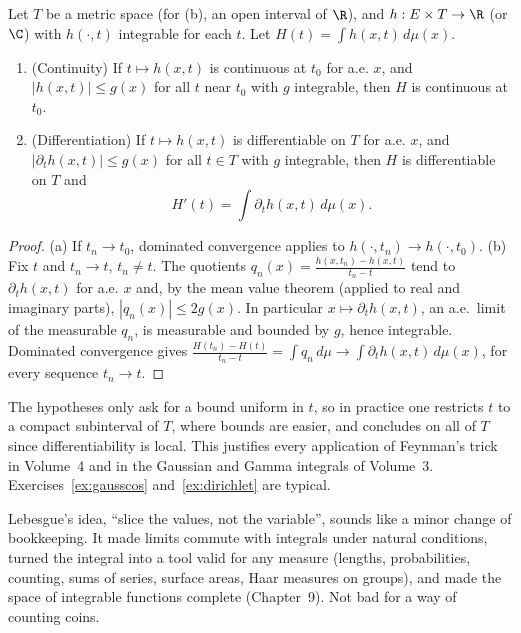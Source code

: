 \begin{theorem}\label{thm:parameter}
Let $T$ be a metric space (for (b), an open interval of $\R$), and $h:E\times T\to\R$ (or $\C$) with $h(\cdot,t)$ integrable for each $t$. Let $H(t)=\int h(x,t)\,d\mu(x)$.
\begin{enumerate}[label=(\alph*)]
\item (Continuity) If $t\mapsto h(x,t)$ is continuous at $t_0$ for a.e. $x$, and $|h(x,t)|\le g(x)$ for all $t$ near $t_0$ with $g$ integrable, then $H$ is continuous at $t_0$.
\item (Differentiation) If $t\mapsto h(x,t)$ is differentiable on $T$ for a.e. $x$, and $|\partial_th(x,t)|\le g(x)$ for all $t\in T$ with $g$ integrable, then $H$ is differentiable on $T$ and
\[H'(t)=\int\partial_th(x,t)\,d\mu(x).\]
\end{enumerate}
\end{theorem}
\begin{proof}
(a) If $t_n\to t_0$, dominated convergence applies to $h(\cdot,t_n)\to h(\cdot,t_0)$. (b) Fix $t$ and $t_n\to t$, $t_n\ne t$. The quotients $q_n(x)=\frac{h(x,t_n)-h(x,t)}{t_n-t}$ tend to $\partial_th(x,t)$ for a.e.
$x$ and, by the mean value theorem (applied to real and imaginary parts), $|q_n(x)|\le2g(x)$. In particular $x\mapsto\partial_th(x,t)$, an a.e.\ limit of the measurable $q_n$, is measurable and bounded by $g$, hence integrable.
Dominated convergence gives $\frac{H(t_n)-H(t)}{t_n-t}=\int q_n\,d\mu\to\int\partial_th(x,t)\,d\mu(x)$, for every sequence $t_n\to t$.
\end{proof}

The hypotheses only ask for a bound uniform in $t$, so in practice one restricts $t$ to a compact subinterval of $T$, where bounds are easier, and
concludes on all of $T$ since differentiability is local. This justifies every application of Feynman's trick in Volume~4 and in the Gaussian and
Gamma integrals of Volume~3. Exercises~\ref{ex:gausscos} and~\ref{ex:dirichlet} are typical.

\begin{beauty}
Lebesgue's idea, ``slice the values, not the variable'', sounds like a minor change of bookkeeping. It made limits commute
with integrals under natural conditions, turned the integral into a tool valid for any measure (lengths, probabilities,
counting, sums of series, surface areas, Haar measures on groups), and made the space of integrable functions complete
(Chapter~9). Not bad for a way of counting coins.
\end{beauty}

